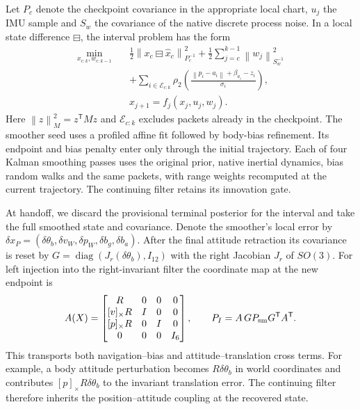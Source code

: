 \documentclass{IEEEtaes}
\newcommand{\norm}[1]{\left\lVert#1\right\rVert}
\newcommand{\sk}[1]{[#1]_\times}
\newcommand{\trans}{^{\mathsf T}}
\begin{document}
Let \(P_c\) denote the checkpoint covariance in the appropriate local chart, \(u_j\) the IMU sample and \(S_w\) the covariance of the native discrete process noise. In a local state difference \(\boxminus\), the interval problem has the form
\begin{align}
 \min_{x_{c:k},w_{c:k-1}}\quad&
 \tfrac12\norm{x_c\boxminus\hat x_c}_{P_c^{-1}}^2
 +\tfrac12\sum_{j=c}^{k-1}\norm{w_j}_{S_w^{-1}}^2 \nonumber\\
 &+\sum_{i\in\mathcal E_{c:k}}\rho_2\!\left(
 \frac{\norm{p_i-a_i}+\beta_{a_i}-z_i}{\sigma_i}\right),
 \label{eq:conditional}\\[-2pt]
 & x_{j+1}= f_j(x_j,u_j,w_j). \nonumber
\end{align}
Here \(\norm{z}_{M}^2=z\trans Mz\) and \(\mathcal E_{c:k}\) excludes packets already in the checkpoint. The smoother seed uses a profiled affine fit followed by body-bias refinement. Its endpoint and bias penalty enter only through the initial trajectory. Each of four Kalman smoothing passes uses the original prior, native inertial dynamics, bias random walks and the same packets, with range weights recomputed at the current trajectory. The continuing filter retains its innovation gate.

At handoff, we discard the provisional terminal posterior for the interval and take the full smoothed state and covariance. Denote the smoother's local error by \(\delta x_P=(\delta\theta_b,\delta v_W,\delta p_W,\delta b_g,\delta b_a)\). After the final attitude retraction its covariance is reset by \(G=\operatorname{diag}(J_r(\delta\theta_b),I_{12})\) with the right Jacobian \(J_r\) of \(SO(3)\). For left injection into the right-invariant filter the coordinate map at the new endpoint is
\begin{equation}
 A(X)=\begin{bmatrix}
 R&0&0&0\\ \sk{v}R&I&0&0\\ \sk{p}R&0&I&0\\
 0&0&0&I_6
 \end{bmatrix},\qquad
 P_I=A\,G P_{\rm sm}G\trans A\trans . \label{eq:cov}
\end{equation}
This transports both navigation--bias and attitude--translation cross terms. For example, a body attitude perturbation becomes \(R\delta\theta_b\) in world coordinates and contributes \(\sk{p}R\delta\theta_b\) to the invariant translation error. The continuing filter therefore inherits the position--attitude coupling at the recovered state.
\end{document}
